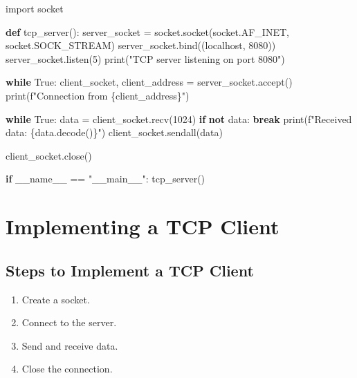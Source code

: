 \documentclass[
  letterpaper,
  DIV=11,
  numbers=noendperiod]{scrreprt}
\newenvironment{Shaded}{\begin{snugshade}}{\end{snugshade}}
\newcommand{\BuiltInTok}[1]{\textcolor[rgb]{0.00,0.23,0.31}{#1}}
\newcommand{\ControlFlowTok}[1]{\textcolor[rgb]{0.00,0.23,0.31}{\textbf{#1}}}
\newcommand{\DecValTok}[1]{\textcolor[rgb]{0.68,0.00,0.00}{#1}}
\newcommand{\ImportTok}[1]{\textcolor[rgb]{0.00,0.46,0.62}{#1}}
\newcommand{\KeywordTok}[1]{\textcolor[rgb]{0.00,0.23,0.31}{\textbf{#1}}}
\newcommand{\NormalTok}[1]{\textcolor[rgb]{0.00,0.23,0.31}{#1}}
\newcommand{\OperatorTok}[1]{\textcolor[rgb]{0.37,0.37,0.37}{#1}}
\newcommand{\SpecialCharTok}[1]{\textcolor[rgb]{0.37,0.37,0.37}{#1}}
\newcommand{\SpecialStringTok}[1]{\textcolor[rgb]{0.13,0.47,0.30}{#1}}
\newcommand{\StringTok}[1]{\textcolor[rgb]{0.13,0.47,0.30}{#1}}
\newcommand{\VariableTok}[1]{\textcolor[rgb]{0.07,0.07,0.07}{#1}}
\providecommand{\tightlist}{%
  \setlength{\itemsep}{0pt}\setlength{\parskip}{0pt}}\usepackage{longtable,booktabs,array}
\begin{document}
\begin{Shaded}
\begin{Highlighting}[]
\ImportTok{import}\NormalTok{ socket}

\KeywordTok{def}\NormalTok{ tcp\_server():}
\NormalTok{    server\_socket }\OperatorTok{=}\NormalTok{ socket.socket(socket.AF\_INET, socket.SOCK\_STREAM)}
\NormalTok{    server\_socket.bind((}\StringTok{\textquotesingle{}localhost\textquotesingle{}}\NormalTok{, }\DecValTok{8080}\NormalTok{))}
\NormalTok{    server\_socket.listen(}\DecValTok{5}\NormalTok{)}
    \BuiltInTok{print}\NormalTok{(}\StringTok{"TCP server listening on port 8080"}\NormalTok{)}

    \ControlFlowTok{while} \VariableTok{True}\NormalTok{:}
\NormalTok{        client\_socket, client\_address }\OperatorTok{=}\NormalTok{ server\_socket.accept()}
        \BuiltInTok{print}\NormalTok{(}\SpecialStringTok{f"Connection from }\SpecialCharTok{\{}\NormalTok{client\_address}\SpecialCharTok{\}}\SpecialStringTok{"}\NormalTok{)}

        \ControlFlowTok{while} \VariableTok{True}\NormalTok{:}
\NormalTok{            data }\OperatorTok{=}\NormalTok{ client\_socket.recv(}\DecValTok{1024}\NormalTok{)}
            \ControlFlowTok{if} \KeywordTok{not}\NormalTok{ data:}
                \ControlFlowTok{break}
            \BuiltInTok{print}\NormalTok{(}\SpecialStringTok{f"Received data: }\SpecialCharTok{\{}\NormalTok{data}\SpecialCharTok{.}\NormalTok{decode()}\SpecialCharTok{\}}\SpecialStringTok{"}\NormalTok{)}
\NormalTok{            client\_socket.sendall(data)}

\NormalTok{        client\_socket.close()}

\ControlFlowTok{if} \VariableTok{\_\_name\_\_} \OperatorTok{==} \StringTok{"\_\_main\_\_"}\NormalTok{:}
\NormalTok{    tcp\_server()}
\end{Highlighting}
\end{Shaded}

\section{Implementing a TCP Client}\label{implementing-a-tcp-client}

\subsection{Steps to Implement a TCP
Client}\label{steps-to-implement-a-tcp-client}

\begin{enumerate}
\def\labelenumi{\arabic{enumi}.}
\tightlist
\item
  Create a socket.
\item
  Connect to the server.
\item
  Send and receive data.
\item
  Close the connection.
\end{enumerate}
\end{document}
